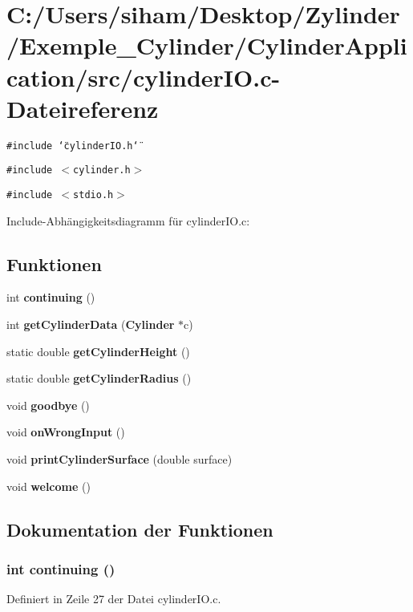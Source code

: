 \section{C:/Users/siham/Desktop/Zylinder/Exemple\_\-Cylinder/Cylinder\-Application/src/cylinder\-IO.c-Dateireferenz}
\label{cylinder_i_o_8c}
{\tt \#include \char`\"{}cylinder\-IO.h\char`\"{}}\par
{\tt \#include $<$cylinder.h$>$}\par
{\tt \#include $<$stdio.h$>$}\par


Include-Abh\"{a}ngigkeitsdiagramm f\"{u}r cylinder\-IO.c:\subsection*{Funktionen}
\begin{CompactItemize}
\item 
int {\bf continuing} ()
\item 
int {\bf get\-Cylinder\-Data} ({\bf Cylinder} $\ast$c)
\item 
static double {\bf get\-Cylinder\-Height} ()
\item 
static double {\bf get\-Cylinder\-Radius} ()
\item 
void {\bf goodbye} ()
\item 
void {\bf on\-Wrong\-Input} ()
\item 
void {\bf print\-Cylinder\-Surface} (double surface)
\item 
void {\bf welcome} ()
\end{CompactItemize}


\subsection{Dokumentation der Funktionen}
\subsubsection{\setlength{\rightskip}{0pt plus 5cm}int continuing ()}\label{cylinder_i_o_8c_fbf29286f9288c2f6a6a903105442720}




Definiert in Zeile 27 der Datei cylinder\-IO.c.

